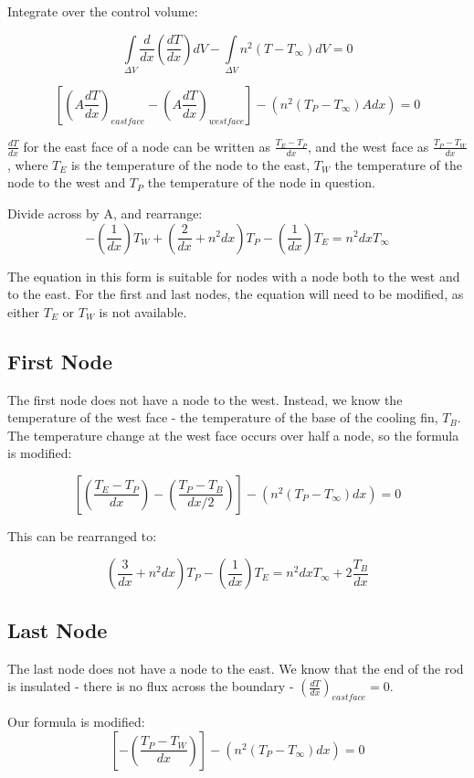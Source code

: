 \documentclass[review]{elsarticle}
\begin{document}
Integrate over the control volume:

\[\int\limits_{\Delta V} \frac{d}{dx}\left(\frac{dT}{dx} \right) dV - \int\limits_{\Delta V} n^2(T-T_{\infty}) dV  = 0\]


\[ \left[ \left(A \frac{dT}{dx} \right)_{eastface} - \left(A \frac{dT}{dx} \right)_{westface} \right] - (n^2 (T_P - T_{\infty})Adx) = 0 \]

\( \frac{dT}{dx} \) for the east face of a node can be written as \( \frac{T_E - T_P}{dx}\), and the west face as \( \frac{T_P - T_W}{dx} \), where \(T_{E}\) is the temperature of the node to the east, \(T_{W}\) the temperature of the node to the west and \(T_{P}\) the temperature of the node in question.

Divide across by A, and rearrange:
\[ - \left(\frac{1}{dx}\right)T_W + \left(\frac{2}{dx} + n^{2}dx\right)T_P - \left(\frac{1}{dx}\right)T_E = n^2dxT_{\infty} \]

The equation in this form is suitable for nodes with a node both to the west and to the east. For the first and last nodes, the equation will need to be modified, as either \(T_E\) or \(T_W\) is not available.

\subsection{First Node}
The first node does not have a node to the west. Instead, we know the temperature of the west face - the temperature of the base of the cooling fin, \(T_B\). The temperature change at the west face occurs over half a node, so the formula is modified:

\[ \left[ \left( \frac{T_E - T_P}{dx} \right) - \left( \frac{T_P - T_B}{dx/2} \right) \right] - (n^2 (T_P - T_{\infty})dx) = 0 \]

This can be rearranged to:

\[ \left(\frac{3}{dx} + n^{2}dx\right)T_P - \left(\frac{1}{dx}\right)T_E = n^2dxT_{\infty} + 2 \frac{T_B}{dx} \]



\subsection{Last Node}
The last node does not have a node to the east. We know that the end of the rod is insulated - there is no flux across the boundary - \(\left(\frac{dT}{dx} \right)_{eastface} = 0 \).

Our formula is modified:
\[ \left[ - \left( \frac{T_P - T_W}{dx} \right) \right] - (n^2 (T_P - T_{\infty})dx) = 0 \]
\end{document}
